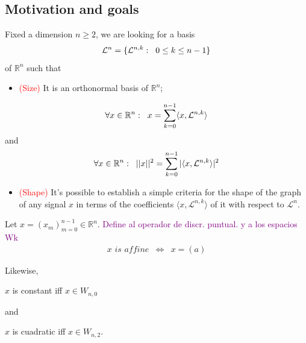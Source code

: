 \documentclass[]{beamer}
\theoremstyle{definition}
\newcommand{\TODO}[1]{\textcolor{purple}{#1}}
\newcommand{\IR}{\mathbb{R}}
\newcommand{\suma}[3]{\sum\limits_{#1}^{#2}#3} %
\newcommand{\cali}[1]{\mathcal{#1}} %
\begin{document}
\begin{frame}
\subsection{Motivation and goals}
Fixed a dimension $n \geq 2$, we are looking for a
basis $$\cali{L}^{n} = \{\cali{L}^{n,k}: \hspace{0.2cm}
0 \leq k \leq n-1\}$$ of $\IR^{n}$ such that
\begin{itemize}
	\item \textcolor{red}{(Size)}
	It is an orthonormal basis of $\IR^{n}$;
\end{itemize}
\[
\forall x\in \IR^{n}: \hspace{0.2cm} x = \suma{k=0}{n-1}{
\langle x, \cali{L}^{n,k} \rangle
}
\]
and
\[
\forall x\in \IR^{n}: \hspace{0.2cm} || x ||^{2} = \suma{k=0}{n-1}{
| \langle x, \cali{L}^{n,k} \rangle |^{2}
}
\]
\begin{itemize}
	\item \textcolor{red}{(Shape)}
	It's possible to establish a simple criteria 
	for the shape of the graph of any signal $x$	
	in terms
	of the coefficients  
	$\langle x, \cali{L}^{n,k} \rangle$ of it with respect
	to $\cali{L}^{n}$.
\end{itemize}


\end{frame}


\begin{frame}
Let $x = (x_{m})_{m=0}^{n-1} \in \IR^{n}$.
\TODO{Define al operador de discr. puntual. y a los espacios Wk}
\begin{align*}
x \textit{ is affine} & \Leftrightarrow &
x = (a)
\end{align*}

Likewise, 
\begin{center}
$x$ is constant iff $x \in W_{n,0}$
\end{center}
and
\begin{center}
$x$ is cuadratic iff $x \in W_{n,2}$.
\end{center}
\end{frame}
\end{document}
